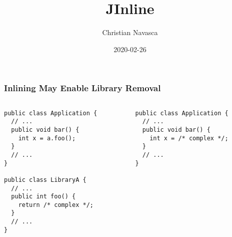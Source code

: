 \documentclass[aspectratio=169]{beamer}
\title{JInline}
\author{Christian Navasca}
\date{2020-02-26}
\begin{document}
  \begin{frame}[plain]
    \titlepage
  \end{frame}

  \setcounter{framenumber}{0}

  \begin{frame}[fragile]
    \frametitle{Inlining May Enable Library Removal}

    \begin{columns}[t]
      \begin{column}{0.5\textwidth}
        \hspace{3.4em} 
        \begin{lstlisting}[xleftmargin=4em]
public class Application {
  // ...
  public void bar() {
    int x = a.foo();
  }
  // ...
}

public class LibraryA {
  // ...
  public int foo() {
    return /* complex */;
  }
  // ...
}
        \end{lstlisting}
      \end{column}
      \begin{column}{0.5\textwidth}
        \hspace{3.4em} 
        \begin{lstlisting}[xleftmargin=4em]
public class Application {
  // ...
  public void bar() {
    int x = /* complex */;
  }
  // ...
}
        \end{lstlisting}
      \end{column}
    \end{columns}
  \end{frame}
\end{document}
